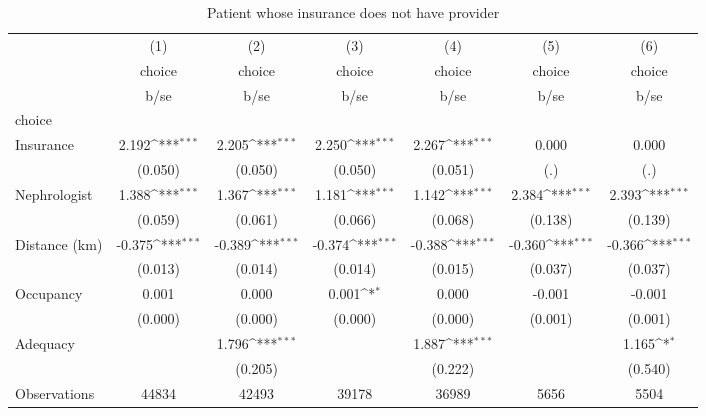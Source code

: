 \begin{table}[htbp]\centering
\def\sym#1{\ifmmode^{#1}\else\(^{#1}\)\fi}
\caption{Patient whose insurance does not have provider}
\begin{tabular}{l*{6}{c}}
\hline\hline
                    &\multicolumn{1}{c}{(1)}&\multicolumn{1}{c}{(2)}&\multicolumn{1}{c}{(3)}&\multicolumn{1}{c}{(4)}&\multicolumn{1}{c}{(5)}&\multicolumn{1}{c}{(6)}\\
                    &\multicolumn{1}{c}{choice}&\multicolumn{1}{c}{choice}&\multicolumn{1}{c}{choice}&\multicolumn{1}{c}{choice}&\multicolumn{1}{c}{choice}&\multicolumn{1}{c}{choice}\\
                    &        b/se         &        b/se         &        b/se         &        b/se         &        b/se         &        b/se         \\
\hline
choice              &                     &                     &                     &                     &                     &                     \\
Insurance           &       2.192\sym{***}&       2.205\sym{***}&       2.250\sym{***}&       2.267\sym{***}&       0.000         &       0.000         \\
                    &     (0.050)         &     (0.050)         &     (0.050)         &     (0.051)         &         (.)         &         (.)         \\
Nephrologist        &       1.388\sym{***}&       1.367\sym{***}&       1.181\sym{***}&       1.142\sym{***}&       2.384\sym{***}&       2.393\sym{***}\\
                    &     (0.059)         &     (0.061)         &     (0.066)         &     (0.068)         &     (0.138)         &     (0.139)         \\
Distance (km)       &      -0.375\sym{***}&      -0.389\sym{***}&      -0.374\sym{***}&      -0.388\sym{***}&      -0.360\sym{***}&      -0.366\sym{***}\\
                    &     (0.013)         &     (0.014)         &     (0.014)         &     (0.015)         &     (0.037)         &     (0.037)         \\
Occupancy           &       0.001         &       0.000         &       0.001\sym{*}  &       0.000         &      -0.001         &      -0.001         \\
                    &     (0.000)         &     (0.000)         &     (0.000)         &     (0.000)         &     (0.001)         &     (0.001)         \\
Adequacy            &                     &       1.796\sym{***}&                     &       1.887\sym{***}&                     &       1.165\sym{*}  \\
                    &                     &     (0.205)         &                     &     (0.222)         &                     &     (0.540)         \\
\hline
Observations        &       44834         &       42493         &       39178         &       36989         &        5656         &        5504         \\
\hline\hline
\end{tabular}
\end{table}
